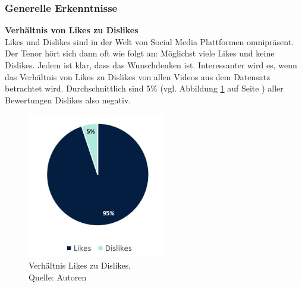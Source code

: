 \documentclass[12pt,titlepage]{article}
\begin{document}
\subsubsection{Generelle Erkenntnisse}
\textbf{Verhältnis von Likes zu Dislikes}\\
Likes und Dislikes sind in der Welt von Social Media Plattformen omnipräsent. Der Tenor hört sich dann oft wie folgt an: Möglichst viele Likes und keine Dislikes. Jedem ist klar, dass das Wunschdenken ist. Interessanter wird es, wenn das Verhältnis von Likes zu Dislikes von allen Videos aus dem Datensatz betrachtet wird. Durchschnittlich sind 5\% (vgl. Abbildung \ref{img: Verhältnis Likes zu Dislikes} auf Seite \pageref{img: Verhältnis Likes zu Dislikes}) aller Bewertungen Dislikes also negativ.
\begin{figure}[h]
	\centering
	\includegraphics[width=6cm]{IMG/grafik_LikesDislikesRatio.JPG}
	\caption[Verhältnis Likes zu Dislikes]{Verhältnis Likes zu Dislikes,\\ Quelle: Autoren}
	\label{img: Verhältnis Likes zu Dislikes}
\end{figure}
\end{document}
